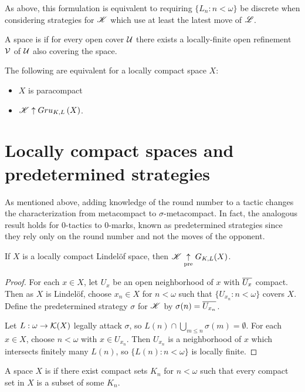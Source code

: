 As above, this formulation is equivalent to requiring $\{L_n:n<\omega\}$ be
discrete when considering strategies for $\mathscr{K}$ which use at least the latest
move of $\mathscr{L}$.

\begin{defn}
  A space is  if for every open cover $\mathcal{U}$ there exists a
  locally-finite open refinement $\mathcal{V}$ of $\mathcal{U}$ also covering the space.
\end{defn}

\begin{thm}
  The following are equivalent for a locally compact space $X$:
    \begin{itemize}
      \item $X$ is paracompact
      \item $\mathscr{K} \uparrow Gru_{K,L}\left({X}\right)$.
    \end{itemize}
\end{thm}


\section{Locally compact spaces and predetermined strategies}

As mentioned above, adding knowledge of the round number to a tactic changes the
characterization from metacompact to $\sigma$-metacompact. In fact, the
analogous result holds
for $0$-tactics to $0$-marks, known as predetermined strategies since they
rely only on the round number and not the moves of the opponent.

\begin{thm}
  If $X$ is a locally compact Lindel\"of space, then $\mathscr{K} \underset{\text{pre}}{\uparrow} G_{K,L}(X)$.
\end{thm}

\begin{proof}
  For each $x\in X$, let $U_x$ be an open neighborhood of $x$ with $\overline{U_x}$
  compact. Then as $X$ is Lindel\"of, choose $x_n\in X$ for $n<\omega$ such that
  $\{U_{x_n}:n<\omega\}$ covers $X$. Define the predetermined strategy $\sigma$
  for $\mathscr{K}$ by $\sigma(n)=\overline{U_{x_n}}$.

  Let $L:\omega\to \mathcal{K}(X)$ legally attack $\sigma$, so
  $L(n)\cap\bigcup_{m\leq n}\sigma(m)=\emptyset$. For each $x\in X$,
  choose $n<\omega$ with $x\in U_{x_n}$. Then $U_{x_n}$ is a neighborhood of
  $x$ which intersects finitely many $L(n)$, so $\{L(n):n<\omega\}$ is
  locally finite.
\end{proof}

\begin{defn}
  A space $X$ is  if there exist compact sets $K_n$ for
  $n<\omega$ such that every compact set in $X$ is a subset of some $K_n$.
\end{defn}

